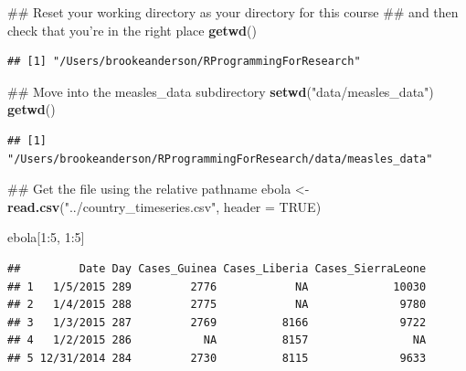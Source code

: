 \documentclass[]{book}
\makeatletter
\newenvironment{Shaded}{\begin{snugshade}}{\end{snugshade}}
\newcommand{\KeywordTok}[1]{\textcolor[rgb]{0.13,0.29,0.53}{\textbf{{#1}}}}
\newcommand{\DataTypeTok}[1]{\textcolor[rgb]{0.13,0.29,0.53}{{#1}}}
\newcommand{\DecValTok}[1]{\textcolor[rgb]{0.00,0.00,0.81}{{#1}}}
\newcommand{\StringTok}[1]{\textcolor[rgb]{0.31,0.60,0.02}{{#1}}}
\newcommand{\OtherTok}[1]{\textcolor[rgb]{0.56,0.35,0.01}{{#1}}}
\newcommand{\NormalTok}[1]{{#1}}
\newenvironment{kframe}{%
\medskip{}
\setlength{\fboxsep}{.8em}
 \def\at@end@of@kframe{}%
 \ifinner\ifhmode%
  \def\at@end@of@kframe{\end{minipage}}%
  \begin{minipage}{\columnwidth}%
 \fi\fi%
 \def\FrameCommand##1{\hskip\@totalleftmargin \hskip-\fboxsep
 \colorbox{shadecolor}{##1}\hskip-\fboxsep
     \hskip-\linewidth \hskip-\@totalleftmargin \hskip\columnwidth}%
 \MakeFramed {\advance\hsize-\width
   \@totalleftmargin\z@ \linewidth\hsize
   \@setminipage}}%
 {\par\unskip\endMakeFramed%
 \at@end@of@kframe}
\renewenvironment{Shaded}{\begin{kframe}}{\end{kframe}}
\makeatother
\begin{document}
\begin{Shaded}
\begin{Highlighting}[]
\NormalTok{## Reset your working directory as your directory for this course}
\NormalTok{## and then check that you're in the right place}
\KeywordTok{getwd}\NormalTok{()}
\end{Highlighting}
\end{Shaded}

\begin{verbatim}
## [1] "/Users/brookeanderson/RProgrammingForResearch"
\end{verbatim}

\begin{Shaded}
\begin{Highlighting}[]
\NormalTok{## Move into the measles_data subdirectory}
\KeywordTok{setwd}\NormalTok{(}\StringTok{"data/measles_data"}\NormalTok{)}
\KeywordTok{getwd}\NormalTok{()}
\end{Highlighting}
\end{Shaded}

\begin{verbatim}
## [1] "/Users/brookeanderson/RProgrammingForResearch/data/measles_data"
\end{verbatim}

\begin{Shaded}
\begin{Highlighting}[]
\NormalTok{## Get the file using the relative pathname}
\NormalTok{ebola <-}\StringTok{ }\KeywordTok{read.csv}\NormalTok{(}\StringTok{"../country_timeseries.csv"}\NormalTok{, }\DataTypeTok{header =} \OtherTok{TRUE}\NormalTok{) }
\end{Highlighting}
\end{Shaded}

\begin{Shaded}
\begin{Highlighting}[]
\NormalTok{ebola[}\DecValTok{1}\NormalTok{:}\DecValTok{5}\NormalTok{, }\DecValTok{1}\NormalTok{:}\DecValTok{5}\NormalTok{]}
\end{Highlighting}
\end{Shaded}

\begin{verbatim}
##         Date Day Cases_Guinea Cases_Liberia Cases_SierraLeone
## 1   1/5/2015 289         2776            NA             10030
## 2   1/4/2015 288         2775            NA              9780
## 3   1/3/2015 287         2769          8166              9722
## 4   1/2/2015 286           NA          8157                NA
## 5 12/31/2014 284         2730          8115              9633
\end{verbatim}
\end{document}

